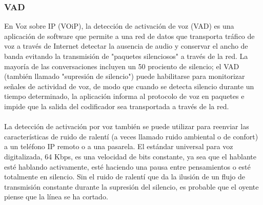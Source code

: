 \documentclass[12pt,letterpaper]{article}
\begin{document}
\subsubsection{VAD}
En Voz sobre IP (VOiP), la detección de activación de voz (VAD) es una aplicación de software 
que permite a una red de datos que transporta tráfico de voz a través de Internet detectar la 
ausencia de audio y conservar el ancho de banda evitando la transmisión de "paquetes 
silenciosos" a través de la red. La mayoría de las conversaciones incluyen un 50 prociento 
de silencio; el VAD (también llamado "supresión de silencio") puede habilitarse para 
monitorizar señales de actividad de voz, de modo que cuando se detecta silencio durante un 
tiempo determinado, la aplicación informa al protocolo de voz en paquetes e impide que la 
salida del codificador sea transportada a través de la red.
\\ \\
La detección de activación por voz también se puede utilizar para reenviar las características 
de ruido de ralentí (a veces llamado ruido ambiental o de confort) a un teléfono IP remoto 
o a una pasarela. El estándar universal para voz digitalizada, 64 Kbps, es una velocidad de 
bits constante, ya sea que el hablante esté hablando activamente, esté haciendo una pausa 
entre pensamientos o esté totalmente en silencio. Sin el ruido de ralentí que da la ilusión 
de un flujo de transmisión constante durante la supresión del silencio, es probable que el 
oyente piense que la línea se ha cortado. \cite{vad}
\end{document}
